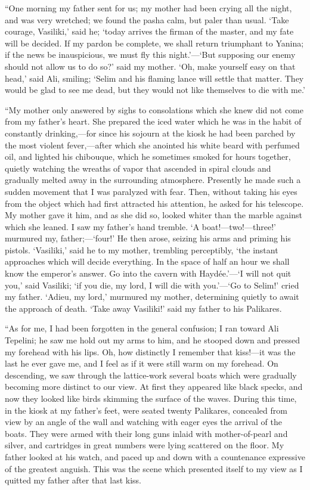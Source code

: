 “One morning my father sent for us; my mother had been crying all the
night, and was very wretched; we found the pasha calm, but paler than
usual. ‘Take courage, Vasiliki,’ said he; ‘today arrives the firman of
the master, and my fate will be decided. If my pardon be complete, we
shall return triumphant to Yanina; if the news be inauspicious, we must
fly this night.’—‘But supposing our enemy should not allow us to do
so?’ said my mother. ‘Oh, make yourself easy on that head,’ said Ali,
smiling; ‘Selim and his flaming lance will settle that matter. They
would be glad to see me dead, but they would not like themselves to die
with me.’

“My mother only answered by sighs to consolations which she knew did
not come from my father’s heart. She prepared the iced water which he
was in the habit of constantly drinking,—for since his sojourn at the
kiosk he had been parched by the most violent fever,—after which she
anointed his white beard with perfumed oil, and lighted his chibouque,
which he sometimes smoked for hours together, quietly watching the
wreaths of vapor that ascended in spiral clouds and gradually melted
away in the surrounding atmosphere. Presently he made such a sudden
movement that I was paralyzed with fear. Then, without taking his eyes
from the object which had first attracted his attention, he asked for
his telescope. My mother gave it him, and as she did so, looked whiter
than the marble against which she leaned. I saw my father’s hand
tremble. ‘A boat!—two!—three!’ murmured my, father;—‘four!’ He then
arose, seizing his arms and priming his pistols. ‘Vasiliki,’ said he to
my mother, trembling perceptibly, ‘the instant approaches which will
decide everything. In the space of half an hour we shall know the
emperor’s answer. Go into the cavern with Haydée.’—‘I will not quit
you,’ said Vasiliki; ‘if you die, my lord, I will die with you.’—‘Go to
Selim!’ cried my father. ‘Adieu, my lord,’ murmured my mother,
determining quietly to await the approach of death. ‘Take away
Vasiliki!’ said my father to his Palikares.

“As for me, I had been forgotten in the general confusion; I ran toward
Ali Tepelini; he saw me hold out my arms to him, and he stooped down
and pressed my forehead with his lips. Oh, how distinctly I remember
that kiss!—it was the last he ever gave me, and I feel as if it were
still warm on my forehead. On descending, we saw through the
lattice-work several boats which were gradually becoming more distinct
to our view. At first they appeared like black specks, and now they
looked like birds skimming the surface of the waves. During this time,
in the kiosk at my father’s feet, were seated twenty Palikares,
concealed from view by an angle of the wall and watching with eager
eyes the arrival of the boats. They were armed with their long guns
inlaid with mother-of-pearl and silver, and cartridges in great numbers
were lying scattered on the floor. My father looked at his watch, and
paced up and down with a countenance expressive of the greatest
anguish. This was the scene which presented itself to my view as I
quitted my father after that last kiss.

